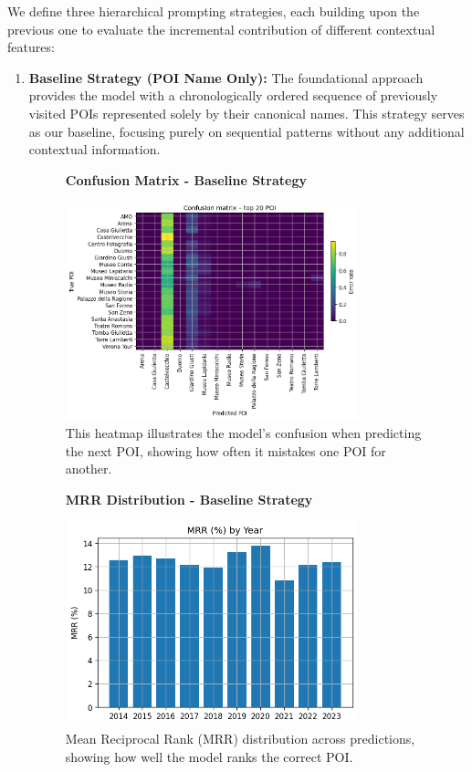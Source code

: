 \documentclass[12pt,a4paper]{article}
\begin{document}
We define three hierarchical prompting strategies, each building upon the previous one to evaluate the incremental contribution of different contextual features:

\begin{enumerate}

\item \textbf{Baseline Strategy (POI Name Only):} The foundational approach provides the model with a chronologically ordered sequence of previously visited POIs represented solely by their canonical names. This strategy serves as our baseline, focusing purely on sequential patterns without any additional contextual information.

\begin{figure}[H]
\centering
\textbf{Confusion Matrix - Baseline Strategy}\par
\vspace{0.5em}
\includegraphics[width=0.8\textwidth]{../img/no_SPACE-GEO_n-1_come_current_POI/confusion_matrix.png}
\caption{This heatmap illustrates the model’s confusion when predicting the next POI, showing how often it mistakes one POI for another.}
\label{fig:baseline_confusion}
\end{figure}

\begin{figure}[H]
\centering
\textbf{MRR Distribution - Baseline Strategy}\par
\vspace{0.5em}
\includegraphics[width=0.8\textwidth]{../img/no_SPACE-GEO_n-1_come_current_POI/mrr_distribution.png}
\caption{Mean Reciprocal Rank (MRR) distribution across predictions, showing how well the model ranks the correct POI.}
\label{fig:baseline_mrr}
\end{figure}


\end{enumerate}
\end{document}
